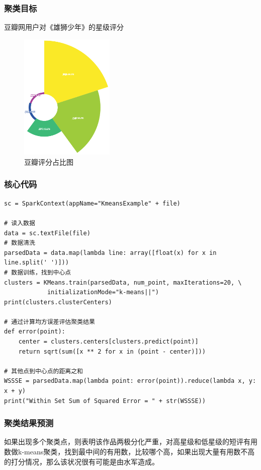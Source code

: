 \documentclass[12pt,a4paper,utf8]{article}
\begin{document}
\subsubsection{聚类目标}

豆瓣网用户对《雄狮少年》的星级评分
\begin{figure}[H]
    \centering
    \includegraphics[width=0.4\textwidth]{images/豆瓣评分-.png}  
    \caption{豆瓣评分占比图}
\end{figure}  
 

\subsubsection{核心代码}
\begin{verbatim}  
sc = SparkContext(appName="KmeansExample" + file)

# 读入数据
data = sc.textFile(file)
# 数据清洗
parsedData = data.map(lambda line: array([float(x) for x in line.split(' ')]))
# 数据训练，找到中心点
clusters = KMeans.train(parsedData, num_point, maxIterations=20, \ 
            initializationMode="k-means||")
print(clusters.clusterCenters)

# 通过计算均方误差评估聚类结果 
def error(point):
    center = clusters.centers[clusters.predict(point)]
    return sqrt(sum([x ** 2 for x in (point - center)]))

# 其他点到中心点的距离之和
WSSSE = parsedData.map(lambda point: error(point)).reduce(lambda x, y: x + y)
print("Within Set Sum of Squared Error = " + str(WSSSE))
\end{verbatim}

\subsubsection{聚类结果预测}
如果出现多个聚类点，则表明该作品两极分化严重，对高星级和低星级的短评有用数做k-means聚类，找到最中间的有用数，比较哪个高，如果出现大量有用数不高的打分情况，那么该状况很有可能是由水军造成。\\
\end{document}
